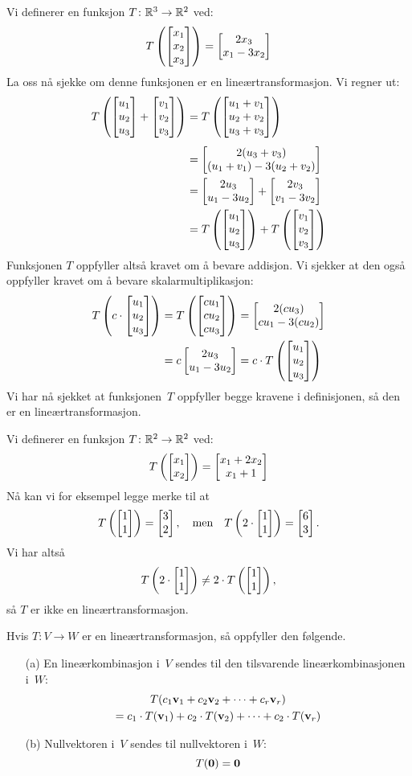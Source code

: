 \begin{ex}
Vi definerer en funksjon $T \colon \mathbb{R}^3 \to \mathbb{R}^2$ ved:
\[
T\left( \begin{bmatrix} x_1 \\ x_2 \\ x_3 \end{bmatrix} \right) = \begin{bmatrix} 2x_3 \\ x_1-3x_2 \end{bmatrix}
\]
La oss nå sjekke om denne funksjonen er en lineærtransformasjon.  Vi
regner ut:
\begin{align*}
T\left( \begin{bmatrix} u_1 \\ u_2 \\ u_3 \end{bmatrix} + \begin{bmatrix} v_1 \\ v_2 \\ v_3 \end{bmatrix} \right)
&= T\left( \begin{bmatrix} u_1 + v_1 \\ u_2 + v_2 \\ u_3 + v_3 \end{bmatrix} \right) \\[4pt]
&= \begin{bmatrix} 2(u_3 + v_3) \\ (u_1 + v_1) - 3(u_2 + v_2) \end{bmatrix} \\
&= \begin{bmatrix} 2u_3 \\ u_1-3u_2 \end{bmatrix} + \begin{bmatrix} 2v_3 \\ v_1-3v_2 \end{bmatrix} \\
&= T\left( \begin{bmatrix} u_1 \\ u_2 \\ u_3 \end{bmatrix} \right) + T\left( \begin{bmatrix} v_1 \\ v_2 \\ v_3 \end{bmatrix} \right)
\end{align*}
Funksjonen $T$ oppfyller altså kravet om å bevare addisjon.  Vi
sjekker at den også oppfyller kravet om å bevare skalarmultiplikasjon:
\begin{align*}
T\left( c \cdot \begin{bmatrix} u_1 \\ u_2 \\ u_3 \end{bmatrix} \right)
&= T\left( \begin{bmatrix} c u_1 \\ c u_2 \\ c u_3 \end{bmatrix} \right)
 = \begin{bmatrix} 2(c u_3) \\ c u_1 - 3(c u_2) \end{bmatrix}\\
&= c \begin{bmatrix} 2 u_3 \\ u_1 - 3 u_2 \end{bmatrix}
 = c \cdot T\left( \begin{bmatrix} u_1 \\ u_2 \\ u_3 \end{bmatrix} \right)
\end{align*}
Vi har nå sjekket at funksjonen~$T$ oppfyller begge kravene i
definisjonen, så den er en lineærtransformasjon.
\end{ex}

\begin{ex}
Vi definerer en funksjon $T \colon \mathbb{R}^2 \to \mathbb{R}^2$ ved:
\[
T\left( \begin{bmatrix} x_1 \\ x_2 \end{bmatrix} \right) = \begin{bmatrix} x_1 + 2 x_2 \\ x_1 + 1 \end{bmatrix}
\]
Nå kan vi for eksempel legge merke til at
\[
T\left( \begin{bmatrix} 1 \\ 1 \end{bmatrix} \right) = \begin{bmatrix} 3 \\ 2 \end{bmatrix},
\quad\text{men}\quad
T\left( 2 \cdot \begin{bmatrix} 1 \\ 1 \end{bmatrix} \right) = \begin{bmatrix} 6 \\ 3 \end{bmatrix}.
\]
Vi har altså
\[
T\left( 2 \cdot \begin{bmatrix} 1 \\ 1 \end{bmatrix} \right) \ne 2 \cdot T\left( \begin{bmatrix} 1 \\ 1 \end{bmatrix} \right),
\]
så $T$ er ikke en lineærtransformasjon.
\end{ex}


\begin{thm}
\label{thm:lin-tr-lin-komb}
Hvis $T \colon V \to W$ er en lineærtransformasjon, så oppfyller den
følgende.
\begin{enumerate}
\item[(a)] En lineærkombinasjon i~$V$ sendes til den tilsvarende
lineærkombinasjonen i~$W$:
\begin{multline*}
T( c_1 \mathbf{v}_1 + c_2 \mathbf{v}_2 + \cdots + c_r \mathbf{v}_r )
\\
= c_1 \cdot T(\mathbf{v}_1) + c_2 \cdot T(\mathbf{v}_2) + \cdots + c_2 \cdot T(\mathbf{v}_r)
\end{multline*}
\item[(b)] Nullvektoren i~$V$ sendes til nullvektoren i~$W$:
\[
T(\mathbf{0}) = \mathbf{0}
\]
\end{enumerate}
\end{thm}

